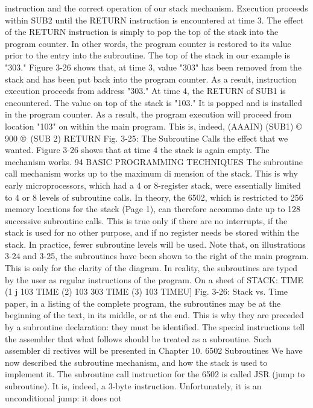 \documentclass{book}
\begin{document}
instruction and the correct operation of our stack mechanism.
Execution proceeds within SUB2 until the RETURN instruction
is encountered at time 3. The effect of the RETURN instruction is
simply to pop the top of the stack into the program counter. In
other words, the program counter is restored to its value prior to
the entry into the subroutine. The top of the stack in our example
is "303." Figure 3-26 shows that, at time 3, value "303" has been
removed from the stack and has been put back into the program
counter. As a result, instruction execution proceeds from address
"303." At time 4, the RETURN of SUB1 is encountered. The value
on top of the stack is "103." It is popped and is installed in the
program counter. As a result, the program execution will proceed
from location "103" on within the main program. This is, indeed,
(AAAIN)
(SUB1)
© 900
®\
(SUB 2)
RETURN
Fig. 3-25: The Subroutine Calls
the effect that we wanted. Figure 3-26 shows that at time 4 the
stack is again empty. The mechanism works.
94
BASIC PROGRAMMING TECHNIQUES
The subroutine call mechanism works up to the maximum di
mension of the stack. This is why early microprocessors, which
had a 4 or 8-register stack, were essentially limited to 4 or 8 levels
of subroutine calls. In theory, the 6502, which is restricted to 256
memory locations for the stack (Page 1), can therefore accommo
date up to 128 successive subroutine calls. This is true only if
there are no interrupts, if the stack is used for no other purpose,
and if no register needs be stored within the stack. In practice,
fewer subroutine levels will be used.
Note that, on illustrations 3-24 and 3-25, the subroutines
have been shown to the right of the main program. This is only for
the clarity of the diagram. In reality, the subroutines are typed by
the user as regular instructions of the program. On a sheet of
STACK: TIME (1 j
103
TIME (2)
103
303
TIME (3)
103
TIMEU]
Fig. 3-26: Stack vs. Time
paper, in a listing of the complete program, the subroutines may
be at the beginning of the text, in its middle, or at the end. This is
why they are preceded by a subroutine declaration: they must be
identified. The special instructions tell the assembler that what
follows should be treated as a subroutine. Such assembler di
rectives will be presented in Chapter 10.
6502 Subroutines
We have now described the subroutine mechanism, and how the
stack is used to implement it. The subroutine call instruction for
the 6502 is called JSR (jump to subroutine). It is, indeed, a 3-byte
instruction. Unfortunately, it is an unconditional jump: it does not
\end{document}
